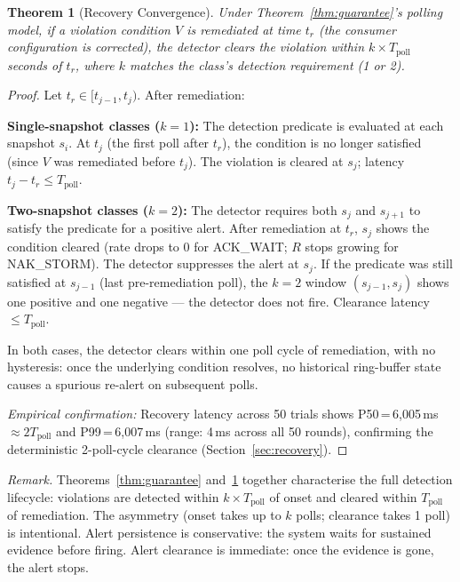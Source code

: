 \documentclass[journal]{IEEEtran}
\newtheorem{theorem}{Theorem}
\begin{document}
\begin{theorem}[Recovery Convergence]
\label{thm:recovery}
Under Theorem~\ref{thm:guarantee}'s polling model, if a violation condition
$V$ is remediated at time $t_r$ (the consumer configuration is corrected),
the detector clears the violation within $k \times T_\text{poll}$ seconds
of $t_r$, where $k$ matches the class's detection requirement (1 or 2).
\end{theorem}

\begin{proof}
Let $t_r \in [t_{j-1}, t_j)$. After remediation:

\textbf{Single-snapshot classes ($k=1$):} The detection predicate is
evaluated at each snapshot $s_i$. At $t_j$ (the first poll after $t_r$),
the condition is no longer satisfied (since $V$ was remediated before $t_j$).
The violation is cleared at $s_j$; latency $t_j - t_r \leq T_\text{poll}$.

\textbf{Two-snapshot classes ($k=2$):} The detector requires both $s_{j}$
and $s_{j+1}$ to satisfy the predicate for a positive alert. After remediation
at $t_r$, $s_j$ shows the condition cleared (rate drops to 0 for ACK\_WAIT;
$R$ stops growing for NAK\_STORM). The detector suppresses the alert at $s_j$.
If the predicate was still satisfied at $s_{j-1}$ (last pre-remediation poll),
the $k=2$ window $(s_{j-1}, s_j)$ shows one positive and one negative --- the
detector does not fire. Clearance latency $\leq T_\text{poll}$.

In both cases, the detector clears within one poll cycle of remediation,
with no hysteresis: once the underlying condition resolves, no historical
ring-buffer state causes a spurious re-alert on subsequent polls.

\textit{Empirical confirmation:} Recovery latency across 50 trials shows
P50\,=\,6{,}005\,ms $\approx 2T_\text{poll}$ and
P99\,=\,6{,}007\,ms (range: 4\,ms across all 50 rounds), confirming the
deterministic 2-poll-cycle clearance (Section~\ref{sec:recovery}).
\end{proof}

\textit{Remark.} Theorems~\ref{thm:guarantee} and~\ref{thm:recovery}
together characterise the full detection lifecycle: violations are
detected within $k \times T_\text{poll}$ of onset and cleared within
$T_\text{poll}$ of remediation. The asymmetry (onset takes up to $k$ polls;
clearance takes 1 poll) is intentional. Alert persistence is conservative:
the system waits for sustained evidence before firing. Alert clearance is
immediate: once the evidence is gone, the alert stops.
\end{document}

